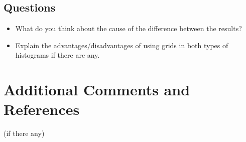 \documentclass[12pt]{article}
\begin{document}
\subsection{Questions}
\begin{itemize}
\item What do you think about the cause of the difference between the results?
\item Explain the advantages/disadvantages of using grids in both types of histograms if there are any.
\end{itemize}


\section{Additional Comments and References}

(if there any)
\end{document}
